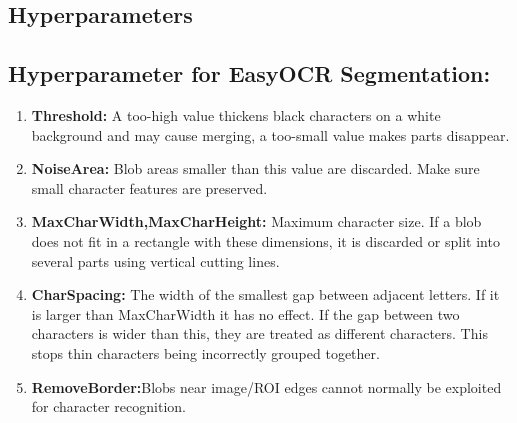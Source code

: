 \subsection{Hyperparameters}
\subsection*{Hyperparameter for EasyOCR Segmentation:} \cite{EasyOCR:2018}
\begin{enumerate}
	\item \textbf{Threshold:} A too-high value thickens black characters on a white background and may cause merging, a too-small value makes parts disappear. 
	\item \textbf{NoiseArea:} Blob areas smaller than this value are discarded. Make sure small character features are preserved.
	\item \textbf{MaxCharWidth,MaxCharHeight:} Maximum character size. If a blob does not fit in a rectangle with these dimensions, it is discarded or split into several parts using vertical cutting lines.
	\item \textbf{CharSpacing:} The width of the smallest gap between adjacent letters. If it is larger than MaxCharWidth it has no effect. If the gap between two characters is wider than this, they are treated as different characters. This stops thin characters being incorrectly grouped together.
	\item \textbf{RemoveBorder:}Blobs near image/ROI edges cannot normally be exploited for character recognition.
\end{enumerate}
